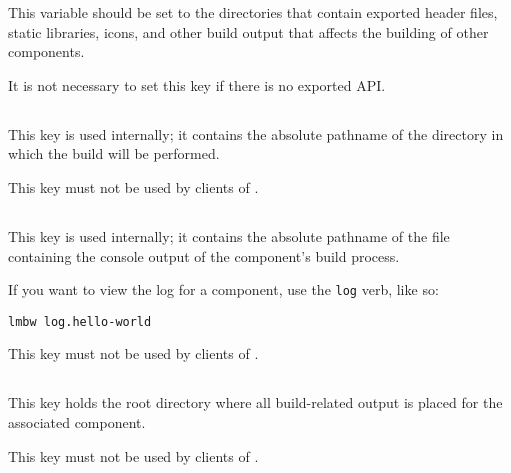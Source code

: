 This variable should be set to the directories that contain exported
header files, static libraries, icons, and other build output that
affects the building of other components.

It is not necessary to set this key if there is no exported API.


\subsection{}\label{variables:build-directory}

This key is used internally; it contains the absolute pathname of the
directory in which the build will be performed.

This key must not be used by clients of \lmsbw.


\subsection{}\label{variables:build-log}

This key is used internally; it contains the absolute pathname of the
file containing the console output of the component's build process.

If you want to view the log for a component, use the \texttt{log}
verb, like so:

\begin{verbatim}
lmbw log.hello-world
\end{verbatim}

This key must not be used by clients of \lmsbw.


\subsection{}\label{variables:build-root-directory}

This key holds the root directory where all build-related output is
placed for the associated component.

This key must not be used by clients of \lmsbw.


\subsection{}\label{variables:build-target}

